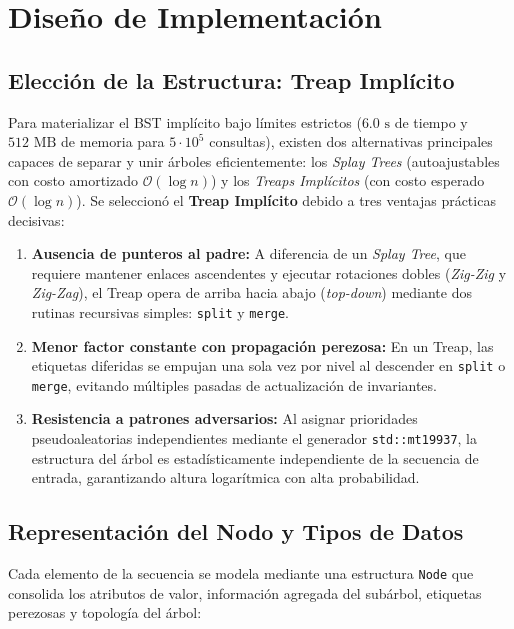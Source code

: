 \documentclass[journal,10pt,a4paper]{IEEEtran}
\begin{document}
\section{Diseño de Implementación}

\subsection{Elección de la Estructura: Treap Implícito}

Para materializar el BST implícito bajo límites estrictos ($6.0\text{ s}$ de tiempo y $512\text{ MB}$ de memoria para $5 \cdot 10^5$ consultas), existen dos alternativas principales capaces de separar y unir árboles eficientemente: los \textit{Splay Trees} (autoajustables con costo amortizado $\mathcal{O}(\log n)$) y los \textit{Treaps Implícitos} (con costo esperado $\mathcal{O}(\log n)$). Se seleccionó el \textbf{Treap Implícito} debido a tres ventajas prácticas decisivas:
\begin{enumerate}
    \item \textbf{Ausencia de punteros al padre:} A diferencia de un \textit{Splay Tree}, que requiere mantener enlaces ascendentes y ejecutar rotaciones dobles (\textit{Zig-Zig} y \textit{Zig-Zag}), el Treap opera de arriba hacia abajo (\textit{top-down}) mediante dos rutinas recursivas simples: \texttt{split} y \texttt{merge}.
    \item \textbf{Menor factor constante con propagación perezosa:} En un Treap, las etiquetas diferidas se empujan una sola vez por nivel al descender en \texttt{split} o \texttt{merge}, evitando múltiples pasadas de actualización de invariantes.
    \item \textbf{Resistencia a patrones adversarios:} Al asignar prioridades pseudoaleatorias independientes mediante el generador \texttt{std::mt19937}, la estructura del árbol es estadísticamente independiente de la secuencia de entrada, garantizando altura logarítmica con alta probabilidad.
\end{enumerate}

\subsection{Representación del Nodo y Tipos de Datos}

Cada elemento de la secuencia se modela mediante una estructura \texttt{Node} que consolida los atributos de valor, información agregada del subárbol, etiquetas perezosas y topología del árbol:
\end{document}
